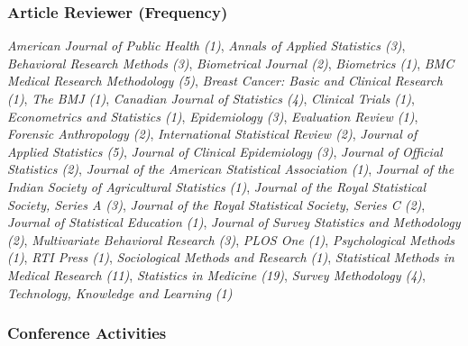\documentclass[
  english,
  letterpaper,
  DIV=11,
  numbers=noendperiod]{scrartcl}
\begin{document}
\subsubsection{Article Reviewer
(Frequency)}\label{article-reviewer-frequency}

\emph{American Journal of Public Health (1)}, \emph{Annals of Applied
Statistics (3)}, \emph{Behavioral Research Methods (3)},
\emph{Biometrical Journal (2)}, \emph{Biometrics (1)}, \emph{BMC Medical
Research Methodology (5)}, \emph{Breast Cancer: Basic and Clinical
Research (1)}, \emph{The BMJ (1)}, \emph{Canadian Journal of Statistics
(4)}, \emph{Clinical Trials (1)}, \emph{Econometrics and Statistics
(1)}, \emph{Epidemiology (3)}, \emph{Evaluation Review (1)},
\emph{Forensic Anthropology (2)}, \emph{International Statistical Review
(2)}, \emph{Journal of Applied Statistics (5)}, \emph{Journal of
Clinical Epidemiology (3)}, \emph{Journal of Official Statistics (2)},
\emph{Journal of the American Statistical Association (1)},
\emph{Journal of the Indian Society of Agricultural Statistics (1)},
\emph{Journal of the Royal Statistical Society, Series A (3)},
\emph{Journal of the Royal Statistical Society, Series C (2)},
\emph{Journal of Statistical Education (1)}, \emph{Journal of Survey
Statistics and Methodology (2)}, \emph{Multivariate Behavioral Research
(3)}, \emph{PLOS One (1)}, \emph{Psychological Methods (1)}, \emph{RTI
Press (1)}, \emph{Sociological Methods and Research (1)},
\emph{Statistical Methods in Medical Research (11)}, \emph{Statistics in
Medicine (19)}, \emph{Survey Methodology (4)}, \emph{Technology,
Knowledge and Learning (1)}

\subsubsection{Conference Activities}\label{conference-activities}
\end{document}
